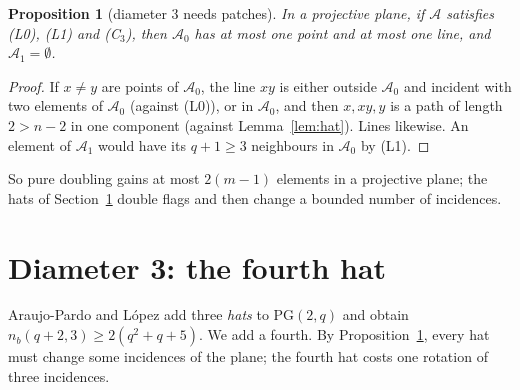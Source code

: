 \documentclass[11pt]{amsart}
\newtheorem{proposition}[theorem]{Proposition}
\theoremstyle{definition}
\theoremstyle{remark}
\numberwithin{equation}{section}
\newcommand{\PG}{\mathrm{PG}}
\newcommand{\nb}{n_b}
\newcommand{\cA}{\mathcal A}
\begin{document}
\begin{proposition}[diameter 3 needs patches]\label{prop:patches}
In a projective plane, if $\cA$ satisfies (L0), (L1) and (C$_3$), then $\cA_0$ has at most one point and at most one
line, and $\cA_1=\emptyset$.
\end{proposition}

\begin{proof}
If $x\ne y$ are points of $\cA_0$, the line $xy$ is either outside $\cA_0$ and incident with two elements of $\cA_0$
(against (L0)), or in $\cA_0$, and then $x,xy,y$ is a path of length $2>n-2$ in one component (against
Lemma~\ref{lem:hat}). Lines likewise. An element of $\cA_1$ would have its $q+1\ge3$ neighbours in $\cA_0$ by (L1).
\end{proof}

So pure doubling gains at most $2(m-1)$ elements in a projective plane; the hats of Section~\ref{sec:d3} double flags
and then change a bounded number of incidences.

\section{Diameter 3: the fourth hat}\label{sec:d3}

Araujo-Pardo and L\'opez \cite{AL20} add three \emph{hats} to $\PG(2,q)$ and obtain $\nb(q+2,3)\ge2(q^2+q+5)$. We add
a fourth. By Proposition~\ref{prop:patches}, every hat must change some incidences of the plane; the fourth hat costs
one rotation of three incidences.
\end{document}
